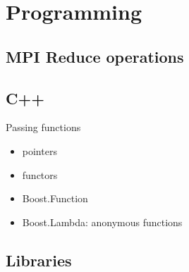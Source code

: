 \begin{frame}{}
  
\end{frame}

\section{Programming}
\label{sec:programming}

\subsection{MPI Reduce operations}
\label{sec:mpi-reduce-oper}

\begin{frame}{}
  
\end{frame}

\subsection{C++}
\label{sec:c++}

\begin{frame}{Passing functions}
  \begin{itemize}
  \item pointers
  \item functors
  \item Boost.Function
  \item Boost.Lambda: anonymous functions
  \end{itemize}
\end{frame}

\subsection{Libraries}
\label{sec:libraries}

\begin{frame}{}
  
\end{frame}







